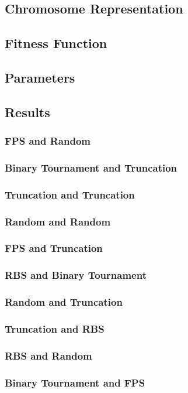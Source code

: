 \documentclass[11pt, letterpaper]{article}
\begin{document}
\subsection{Chromosome Representation}

\subsection{Fitness Function}
\subsection{Parameters}
\subsection{Results} 
\subsubsection {FPS and Random}
\subsubsection {Binary Tournament and Truncation}
\subsubsection {Truncation and Truncation}
\subsubsection {Random and Random}
\subsubsection {FPS and Truncation}
\subsubsection {RBS and Binary Tournament}
\subsubsection {Random and Truncation}
\subsubsection {Truncation and RBS}
\subsubsection {RBS and Random}
\subsubsection {Binary Tournament and FPS}
\end{document}
